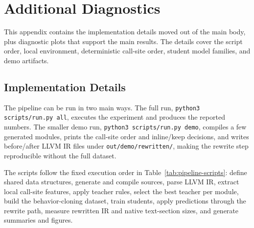 \documentclass[12pt, a4paper]{report}
\begin{document}
\appendix

\chapter{Additional Diagnostics}
\label{app:additional-diagnostics}

This appendix contains the implementation details moved out of the main body,
plus diagnostic plots that support the main results. The details cover the
script order, local environment, deterministic call-site order, student model
families, and demo artifacts.

\section{Implementation Details}

The pipeline can be run in two main ways. The full run,
\texttt{python3 scripts/run.py all}, executes the experiment and produces the
reported numbers. The smaller demo run, \texttt{python3 scripts/run.py demo},
compiles a few generated modules, prints the call-site order and inline/keep
decisions, and writes before/after LLVM IR files under
\texttt{out/demo/rewritten/}, making the rewrite step reproducible without the
full dataset.

The scripts follow the fixed execution order in
Table~\ref{tab:pipeline-scripts}: define shared data structures, generate and
compile sources, parse LLVM IR, extract local call-site features, apply teacher
rules, select the best teacher per module, build the behavior-cloning dataset,
train students, apply predictions through the rewrite path, measure rewritten IR
and native text-section sizes, and generate summaries and figures.
\end{document}
